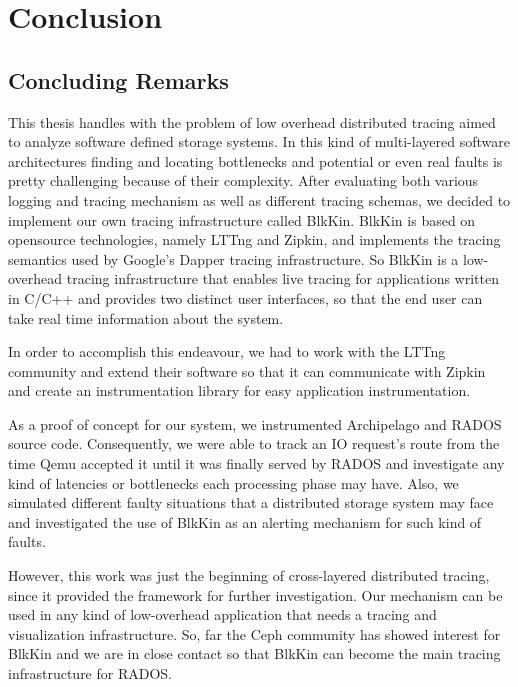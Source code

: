 \chapter{Conclusion}\label{ch:conclusion}

\section{Concluding Remarks}

This thesis handles with the problem of low overhead distributed tracing aimed
to analyze software defined storage systems. In this kind of multi-layered
software architectures finding and locating bottlenecks and potential or even
real faults is pretty challenging because of their complexity. After evaluating
both various logging and tracing mechanism as well as different tracing schemas,
we decided to implement our own tracing infrastructure called BlkKin. BlkKin is
based on opensource technologies, namely LTTng and Zipkin, and implements the
tracing semantics used by Google's Dapper tracing infrastructure. So BlkKin is a
low-overhead tracing infrastructure that enables live tracing for applications
written in C/C++ and provides two distinct user interfaces, so that the end user
can take real time information about the system.

In order to accomplish this endeavour, we had to work with the LTTng community
and extend their software so that it can communicate with Zipkin and create an
instrumentation library for easy application instrumentation.

As a proof of concept for our system, we instrumented Archipelago and RADOS
source code. Consequently, we were able to track an IO request's route from the
time Qemu accepted it until it was finally served by RADOS and investigate any
kind of latencies or bottlenecks each processing phase may have. Also, we
simulated different faulty situations that a distributed storage system may face
and investigated the use of BlkKin as an alerting mechanism for such kind of
faults.

However, this work was just the beginning of cross-layered distributed tracing,
since it provided the framework for further investigation. Our mechanism can be
used in any kind of low-overhead application that needs a tracing and
visualization infrastructure.  So, far the Ceph community has showed interest
for BlkKin and we are in close contact so that BlkKin can become the main
tracing infrastructure for RADOS. 
 
